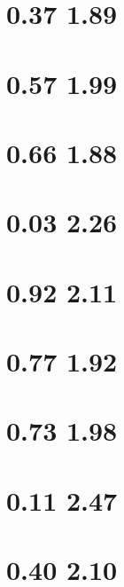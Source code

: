 \documentclass[
  letterpaper,
  DIV=11,
  numbers=noendperiod]{scrreprt}
\begin{document}
{

\chapter{0.37 1.89}\label{section-14}


\chapter{0.57 1.99}\label{section-15}


\chapter{0.66 1.88}\label{section-16}


\chapter{0.03 2.26}\label{section-17}


\chapter{0.92 2.11}\label{section-18}


\chapter{0.77 1.92}\label{section-19}


\chapter{0.73 1.98}\label{section-20}


\chapter{0.11 2.47}\label{section-21}


\chapter{0.40 2.10}\label{section-22}

}
\end{document}
